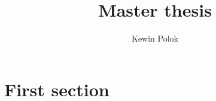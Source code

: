 \documentclass[polish, twoside, 12pt]{mwart}
\author{Kewin Polok}
\title{Master thesis}
\begin{document}
\maketitle
 
\newpage

\tableofcontents

\newpage

\section{First section}
\end{document}
